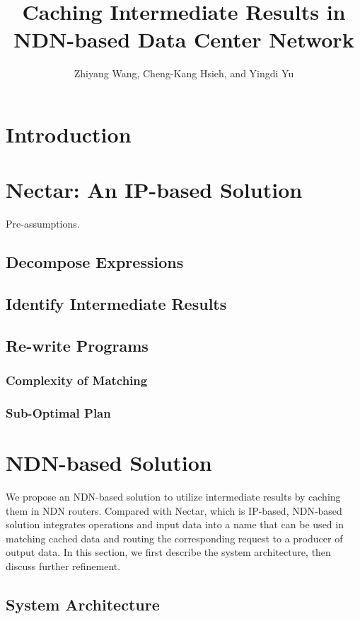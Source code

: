\documentclass[journal]{IEEEtran}
\begin{document}
\title{Caching Intermediate Results in NDN-based Data Center Network}

\author{Zhiyang Wang,
  Cheng-Kang Hsieh,
  and Yingdi Yu}

\maketitle

\section{Introduction}
\section{Nectar: An IP-based Solution}
Pre-assumptions.
\subsection{Decompose Expressions}
\subsection{Identify Intermediate Results}
\subsection{Re-write Programs}
\subsubsection{Complexity of Matching}
\subsubsection{Sub-Optimal Plan}
\section{NDN-based Solution}
We propose an NDN-based solution to utilize intermediate results by caching them
in NDN routers.  Compared with Nectar, which is IP-based, NDN-based solution
integrates operations and input data into a name that can be used in matching
cached data and routing the corresponding request to a producer of output data.
In this section, we first describe the system architecture, then discuss further
refinement.

\subsection{System Architecture}
\end{document}
